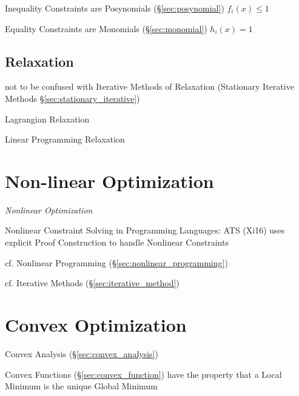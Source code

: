 Inequality Constraints are Posynomials (\S\ref{sec:posynomial})
$f_i(x) \leq 1$

Equality Constraints are Monomials (\S\ref{sec:monomial}) $h_i(x) = 1$



\subsection{Relaxation}\label{sec:relaxation}

\fist not to be confused with Iterative Methods of Relaxation (Stationary
Iterative Methods \S\ref{sec:stationary_iterative})

Lagrangian Relaxation

Linear Programming Relaxation



\section{Non-linear Optimization}\label{sec:nonlinear_optimization}


\emph{Nonlinear Optimization}

Nonlinear Constraint Solving in Programming Languages: ATS (Xi16) uses
explicit Proof Construction to handle Nonlinear Constraints

\fist cf. Nonlinear Programming (\S\ref{sec:nonlinear_programming})

\fist cf. Iterative Methods (\S\ref{sec:iterative_method})



\section{Convex Optimization}\label{sec:convex_optimization}

Convex Analysis (\S\ref{sec:convex_analysis})

Convex Functions (\S\ref{sec:convex_function}) have the property that a Local
Minimum is the unique Global Minimum

